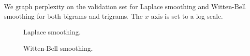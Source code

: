 \documentclass[11pt]{article}
\begin{document}
We graph perplexity on the validation set for Laplace smoothing and Witten-Bell smoothing for both bigrams and trigrams. The $x$-axis is set to a log scale. 

\begin{figure}
\centering
{}
\hfill
{}
\caption{Laplace smoothing.}
\end{figure}

\begin{figure}
\centering
{}
\hfill
{}
\caption{Witten-Bell smoothing.}
\end{figure}
\end{document}
